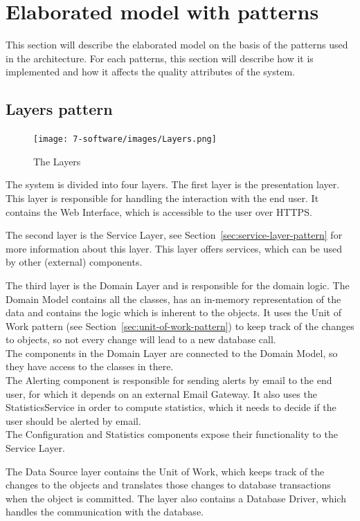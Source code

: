 
\clearpage
\section{Elaborated model with patterns}
This section will describe the elaborated model on the basis of the patterns used in the architecture. For each patterns, this section will describe how it is implemented and how it affects the quality attributes of the system.

\subsection{Layers pattern}
\begin{figure}[H]
\centering
\texttt{[image: 7-software/images/Layers.png]}
\caption{The Layers}
\label{fig:layers}
\end{figure}
The system is divided into four layers. The first layer is the presentation layer. This layer is responsible for handling the interaction with the end user. It contains the Web Interface, which is accessible to the user over HTTPS.

The second layer is the Service Layer, see Section~\ref{sec:service-layer-pattern} for more information about this layer. This layer offers services, which can be used by other (external) components.

The third layer is the Domain Layer and is responsible for the domain logic. The Domain Model contains all the classes, has an in-memory representation of the data and contains the logic which is inherent to the objects.
It uses the Unit of Work pattern (see Section~\ref{sec:unit-of-work-pattern}) to keep track of the changes to objects, so not every change will lead to a new database call. \\
The components in the Domain Layer are connected to the Domain Model, so they have access to the classes in there. \\
The Alerting component is responsible for sending alerts by email to the end user, for which it depends on an external Email Gateway. It also uses the StatisticsService in order to compute statistics, which it needs to decide if the user should be alerted by email. \\
The Configuration and Statistics components expose their functionality to the Service Layer.

The Data Source layer contains the Unit of Work, which keeps track of the changes to the objects and translates those changes to database transactions when the object is committed. The layer also contains a Database Driver, which handles the communication with the database.

